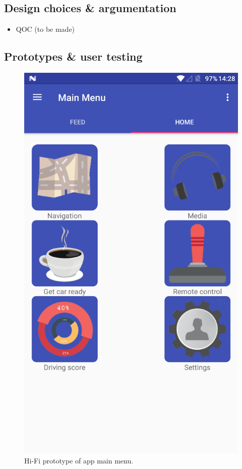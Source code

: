 \documentclass{article}
\begin{document}
\subsection{Design choices \& argumentation}\label{ssec:app-design}
\begin{itemize}
  \item QOC (to be made)
\end{itemize}

\subsection{Prototypes \& user testing}\label{ssec:app-prototypes-testing}
\begin{figure}[H]
  \centering
  \includegraphics[scale=0.25]{main-menu}
  \caption{Hi-Fi prototype of app main menu.}\label{main-menu}
\end{figure}
\end{document}
